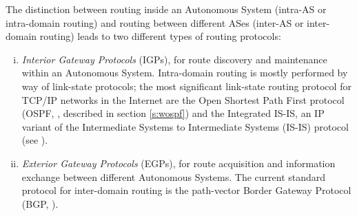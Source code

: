 The distinction between routing inside an Autonomous System (intra-AS or intra-domain routing) and routing between different ASes (inter-AS or inter-domain routing) leads to two different types of routing protocols: 

\begin{enumerate}[(i)]
\item {\em Interior Gateway Protocols} (IGPs), for route discovery and maintenance within an Autonomous System. Intra-domain routing is mostly performed by way of link-state protocols; the most significant link-state routing protocol for TCP/IP networks in the Internet are the Open Shortest Path First protocol (OSPF, \cite{rfc2328, rfc5340}, described in section \ref{s:wospf}) and the Integrated IS-IS, an IP variant of the Intermediate Systems to Intermediate Systems (IS-IS) protocol (see \cite{rfc1195}).
\item {\em Exterior Gateway Protocols} (EGPs), for route acquisition and information exchange between different Autonomous Systems. The current standard protocol for inter-domain routing is the path-vector Border Gateway Protocol (BGP, \cite{rfc1771}).
\end{enumerate}


